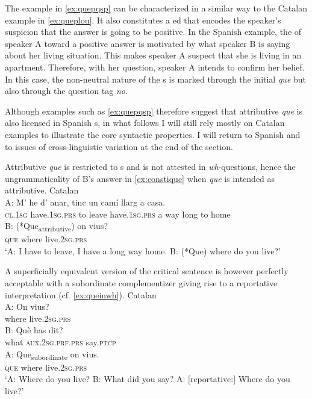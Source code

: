 The  example in \eqref{ex:quepqsp} can be characterized in a similar way to the Catalan example in \eqref{ex:queplou}. It also constitutes a ed  that encodes the speaker's suspicion that the answer is going to be positive. In the Spanish example, the  of speaker A toward a positive answer is motivated by  what speaker B is saying about her living situation. This makes speaker A suspect that she is living in an apartment. Therefore, with her question,  speaker A intends to confirm her belief.  In this case, the non-neutral nature of the s is marked through the initial \emph{que} but also through the question tag \emph{no}. 

Although examples such as \eqref{ex:quepqsp} therefore suggest that attributive \emph{que} is also licensed in Spanish s, in what follows I will still  rely mostly on Catalan examples to illustrate the core syntactic properties. I will  return to Spanish and to issues of cross-linguistic variation at the end of the section.

Attributive \emph{que} is restricted to s and is not attested in \textit{wh}-ques\-tions, hence the ungrammaticality of B's answer in \eqref{ex:constique} when \emph{que} is intended  as attributive. 
\ea 
\ea \label{ex:constique}
Catalan\\
		\gll A: M' he d' anar, tinc un  camí llarg a casa. \\
			{} \textsc{cl.1sg} have.\textsc{1sg.prs} to leave have.\textsc{1sg.prs} a  way long to home \\
		\exi{}\gll   B:  (*Que\textsubscript{attributive}) on vius?\\
	{}	{\phantom{(*}\textsc{que}} where live.\textsc{2sg.prs}\\
		\glt `A: I have to leave, I have a long way home. B: (*Que) where do you live?'
	\z
\z

A superficially equivalent version of the critical sentence is however perfectly acceptable with a subordinate complementizer giving rise to a reportative interpretation (cf. \ref{ex:queinwh}).
\ea \label{ex:queinwh} 
Catalan\\
\gll A: On vius? \\
		{} where  live.\textsc{2sg.prs}\\
\exi{}\gll  B: Què has dit? \\
 {} what \textsc{aux.2sg.prf.prs} say.\textsc{ptcp} \\
 \exi{}\gll A: Que\textsubscript{subordinate} on vius.\\
 { } 	\textsc{que} where live.\textsc{2sg.prs}\\
	\glt `A: Where do you live? B: What did you say? A: [reportative:] Where do you live?'
\z

